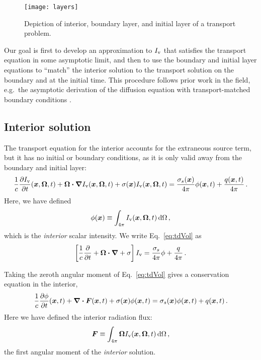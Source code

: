 \begin{figure}[htb]
  \centering
  \texttt{[image: layers]}
  \caption{Depiction of interior, boundary layer, and initial layer of a
  transport problem.}
  \label{fig:layers}
\end{figure}

Our goal is first to develop an approximation to $I_\mathrm{v}$ that satisfies the transport
equation in some asymptotic limit, and then to use the boundary and initial layer
equations to ``match'' the interior solution to the transport solution on the
boundary and at the initial time. This procedure follows prior work in the
field, e.g.~the asymptotic derivation of the diffusion equation with
transport-matched boundary conditions \cite{Mal1991}.

\subsection{Interior solution}

The transport equation for the interior accounts for the extraneous source term,
but
it has no initial or boundary conditions, as it is only valid away from the
boundary and initial layer:
\begin{equation} \label{eq:tdVol}
  \frac{1}{c}\frac{\partial I_\mathrm{v}}{\partial t}(\bm{x},\bm{\Omega},t)
  + \bm{\Omega}\bm{\cdot} \bm{\nabla} I_\mathrm{v}(\bm{x},\bm{\Omega},t)
  + \sigma(\bm{x}) I_\mathrm{v}(\bm{x},\bm{\Omega},t)
  = \frac{\sigma_s(\bm{x})}{4\pi}
  \phi(\bm{x},t) + \frac{q(\bm{x},t)}{4\pi} \,.
\end{equation}
Here, we have defined
\begin{equation} \label{eq:tdPhi}
  \phi(\bm{x}) \equiv \int_{4\pi} I_\mathrm{v}(\bm{x}, \bm{\Omega},t) \mathop{}\!\mathrm{d} \Omega\,,
\end{equation}
which is the \emph{interior} scalar intensity. We write Eq.~\eqref{eq:tdVol} as
\begin{equation*}
  \left[ \frac{1}{c}\frac{\partial }{\partial t}
  + \bm{\Omega}\bm{\cdot} \bm{\nabla}
  + \sigma \right] I_\mathrm{v}
  = \frac{\sigma_s}{4\pi}
  \phi + \frac{q}{4\pi} \,.
\end{equation*}

Taking the zeroth angular moment of Eq.~\eqref{eq:tdVol} gives a conservation
equation in the interior,
\begin{equation} \label{eq:loVol}
\frac{1}{c} \frac{\partial \phi}{\partial t} (\bm{x}, t)
  + \bm{\nabla} \bm{\cdot}\bm{F}(\bm{x}, t)
  + \sigma(\bm{x}) \phi(\bm{x}, t)
 = \sigma_s(\bm{x}) \phi(\bm{x},t) + q(\bm{x},t)\,.
\end{equation}
Here we have defined the interior radiation flux:
\begin{equation*}
  \bm{F} \equiv \int_{4\pi} \bm{\Omega} I_\mathrm{v}(\bm{x}, \bm{\Omega},t) \mathop{}\!\mathrm{d}
  \Omega\,,
\end{equation*}
the first angular moment of the \emph{interior} solution.

